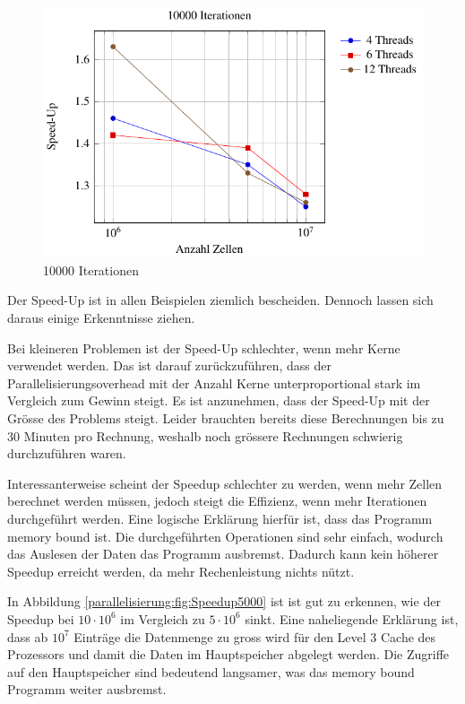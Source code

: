 	
	\begin{figure}
		\centering
		\includegraphics{papers/parallelisierung/images/speedup10000.pdf}
		\caption{10000 Iterationen}
		\label{parallelisierung:fig:Speedup10000}
	\end{figure}
	

Der Speed-Up ist in allen Beispielen ziemlich bescheiden.
Dennoch lassen sich daraus einige Erkenntnisse ziehen.

Bei kleineren Problemen ist der Speed-Up schlechter, wenn mehr Kerne verwendet werden.
Das ist darauf zurückzuführen, dass der Parallelisierungsoverhead mit der Anzahl Kerne unterproportional stark im Vergleich zum Gewinn steigt.
Es ist anzunehmen, dass der Speed-Up mit der Grösse des Problems steigt.
Leider brauchten bereits diese Berechnungen bis zu 30 Minuten pro Rechnung, weshalb noch grössere Rechnungen schwierig durchzuführen waren.

Interessanterweise scheint der Speedup schlechter zu werden, wenn mehr Zellen berechnet werden müssen, jedoch steigt die Effizienz, wenn mehr Iterationen durchgeführt werden.
Eine logische Erklärung hierfür ist, dass das Programm memory bound ist.
Die durchgeführten Operationen sind sehr einfach, wodurch das Auslesen der Daten das Programm ausbremst.
Dadurch kann kein höherer Speedup erreicht werden, da mehr Rechenleistung nichts nützt.

In Abbildung \ref{parallelisierung:fig:Speedup5000} ist ist gut zu erkennen, wie der Speedup bei $10 \cdot 10^6$ im Vergleich zu $5 \cdot 10^6$ sinkt.
Eine naheliegende Erklärung ist, dass ab $10^7$ Einträge die Datenmenge zu gross wird für den Level 3 Cache des Prozessors und damit die Daten im Hauptspeicher abgelegt werden.
Die Zugriffe auf den Hauptspeicher sind bedeutend langsamer, was das memory bound Programm weiter ausbremst.

